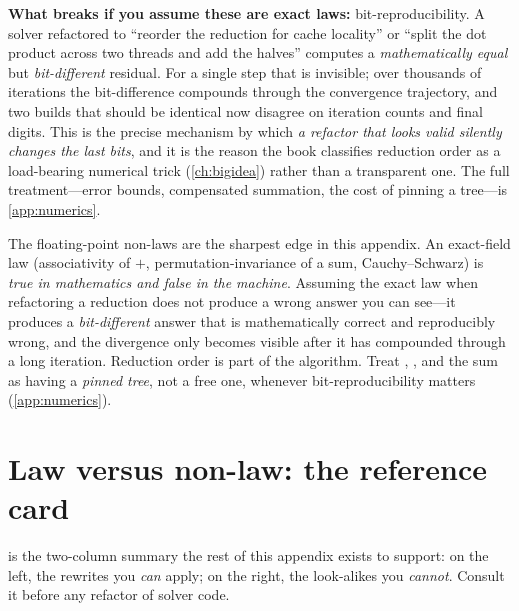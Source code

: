 \textbf{What breaks if you assume these are exact laws:} bit-reproducibility. A
solver refactored to ``reorder the reduction for cache locality'' or ``split the dot
product across two threads and add the halves'' computes a \emph{mathematically
equal} but \emph{bit-different} residual. For a single step that is invisible; over
thousands of iterations the bit-difference compounds through the convergence
trajectory, and two builds that should be identical now disagree on iteration counts
and final digits. This is the precise mechanism by which \emph{a refactor that looks
valid silently changes the last bits}, and it is the reason the book classifies
reduction order as a load-bearing numerical trick (\cref{ch:bigidea}) rather than a
transparent one. The full treatment---error bounds, compensated summation, the cost
of pinning a tree---is \cref{app:numerics}.

\begin{keyidea}
The floating-point non-laws are the sharpest edge in this appendix. An exact-field
law (associativity of $+$, permutation-invariance of a sum, Cauchy--Schwarz) is
\emph{true in mathematics and false in the machine}. Assuming the exact law when
refactoring a reduction does not produce a wrong answer you can see---it produces a
\emph{bit-different} answer that is mathematically correct and reproducibly wrong, and
the divergence only becomes visible after it has compounded through a long iteration.
Reduction order is part of the algorithm. Treat , , and the
 sum as having a \emph{pinned tree}, not a free one, whenever
bit-reproducibility matters (\cref{app:numerics}).
\end{keyidea}

\section{Law versus non-law: the reference card}
\label{sec:ccard}

 is the two-column summary the rest of this appendix exists to
support: on the left, the rewrites you \emph{can} apply; on the right, the
look-alikes you \emph{cannot}. Consult it before any refactor of solver code.

